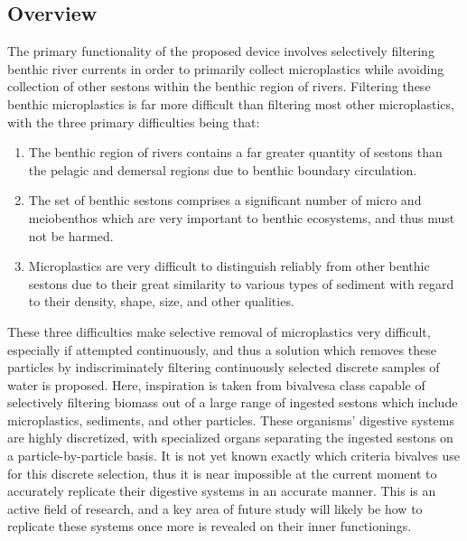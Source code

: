 \documentclass[fleqn,10pt]{SelfArx} %
\begin{document}
	\subsection{Overview}
	The primary functionality of the proposed device involves selectively filtering benthic river currents in order to primarily collect microplastics while avoiding collection of other sestons within the benthic region of rivers. Filtering these benthic microplastics is far more difficult than filtering most other microplastics, with the three primary difficulties being that: 
	\begin{enumerate}
		\item The benthic region of rivers contains a far greater quantity of sestons than the pelagic and demersal regions due to benthic boundary circulation.
		\item The set of benthic sestons comprises a significant number of micro and meiobenthos which are very important to benthic ecosystems, and thus must not be harmed. 
		\item Microplastics are very difficult to distinguish reliably from other benthic sestons due to their great similarity to various types of sediment with regard to their density, shape, size, and other qualities.
	\end{enumerate}
	These three difficulties make selective removal of microplastics very difficult, especially if attempted continuously, and thus a solution which removes these particles by indiscriminately filtering continuously selected discrete samples of water is proposed. Here, inspiration is taken from bivalves\textemdash a class capable of selectively filtering biomass out of a large range of ingested sestons which include microplastics, sediments, and other particles. These organisms’ digestive systems are highly discretized, with specialized organs separating the ingested sestons on a particle-by-particle basis. It is not yet known exactly which criteria bivalves use for this discrete selection, thus it is near impossible at the current moment to accurately replicate their digestive systems in an accurate manner. This is an active field of research, and a key area of future study will likely be how to replicate these systems once more is revealed on their inner functionings. 
	
\end{document}
